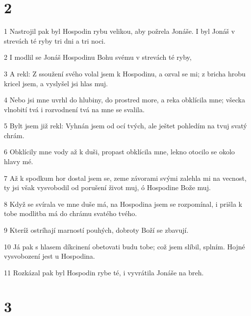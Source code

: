 \chapter{2}

\par 1 Nastrojil pak byl Hospodin rybu velikou, aby požrela Jonáše. I byl Jonáš v strevách té ryby tri dni a tri noci.
\par 2 I modlil se Jonáš Hospodinu Bohu svému v strevách té ryby,
\par 3 A rekl: Z ssoužení svého volal jsem k Hospodinu, a ozval se mi; z bricha hrobu kricel jsem, a vyslyšel jsi hlas muj.
\par 4 Nebo jsi mne uvrhl do hlubiny, do prostred more, a reka obklícila mne; všecka vlnobití tvá i rozvodnení tvá na mne se svalila.
\par 5 Bylt jsem již rekl: Vyhnán jsem od ocí tvých, ale ještet pohledím na tvuj svatý chrám.
\par 6 Obklícily mne vody až k duši, propast obklícila mne, lekno otocilo se okolo hlavy mé.
\par 7 Až k spodkum hor dostal jsem se, zeme závorami svými zalehla mi na vecnost, ty jsi však vysvobodil od porušení život muj, ó Hospodine Bože muj.
\par 8 Když se svírala ve mne duše má, na Hospodina jsem se rozpomínal, i prišla k tobe modlitba má do chrámu svatého tvého.
\par 9 Kteríž ostríhají marností pouhých, dobroty Boží se zbavují.
\par 10 Já pak s hlasem díkcinení obetovati budu tobe; což jsem slíbil, splním. Hojné vysvobození jest u Hospodina.
\par 11 Rozkázal pak byl Hospodin rybe té, i vyvrátila Jonáše na breh.

\chapter{3}

